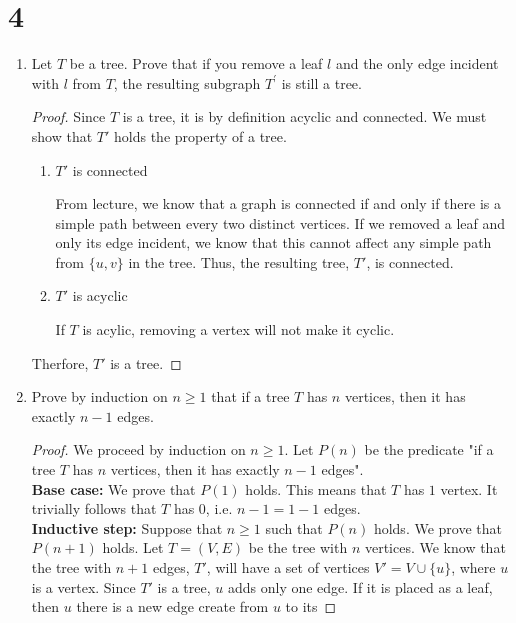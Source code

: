 \documentclass[11pt]{scrartcl}
\begin{document}
\section{4}
\begin{enumerate}[label=\alph*.]
	\item{
	      Let $T$ be a tree. Prove that if you remove a leaf $l$ and the only edge incident with $l$ from $T$,
	      the resulting subgraph $T^{\prime}$ is still a tree.
	      \begin{proof}
		      Since $T$ is a tree, it is by definition acyclic and connected. We must show that $T'$
		      holds the property of a	tree.
		      \begin{enumerate}[label=\roman*.]
			      \item{
			            $T'$ is connected \par
			            From lecture, we know that a graph is connected if and only if there is a simple path between
			            every two distinct vertices. If we removed a leaf and only its edge incident, we know that
			            this cannot affect any simple path from $\{u,v\}$ in the tree. Thus, the resulting tree, $T'$,
			            is connected.
			            }
			      \item{
			            $T'$ is acyclic \par
			            If $T$ is acylic, removing a vertex will not make it cyclic.
			            }
		      \end{enumerate}
		      Therfore, $T'$ is a tree.
	      \end{proof}
	      }
	\item{
	      Prove by induction on $n \geq 1$ that if a tree $T$ has $n$ vertices, then
	      it has exactly $n-1$ edges.
	      \begin{proof}
		      We proceed by induction on  $n \geq 1$. Let $P(n)$ be the predicate
		      "if a tree $T$ has $n$ vertices, then it has exactly $n-1$ edges".\\
		      \textbf{Base case:} We prove that $P(1)$ holds. This means that $T$
		      has $1$ vertex. It trivially follows that $T$ has $0$, i.e. $n-1 = 1 - 1 $ edges. \\
		      \textbf{Inductive step:} Suppose that $n \geq 1$ such that $P(n)$ holds. We prove that $P(n + 1)$ holds.
		      Let $T = (V,E)$ be the tree with $n$ vertices. We know that the tree with $n+1$ edges, $T'$,
		      will have a set of vertices $V' = V \cup \{u\}$, where $u$ is a vertex. Since $T'$ is a tree,
		      $u$ adds only one edge. If it is placed as a leaf, then $u$ there is a new edge create from $u$ to its

\end{proof}}
\end{enumerate}
\end{document}
